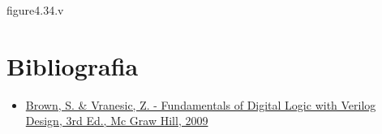 \begin{frame}[fragile]{figure4.34.v}
\end{frame} 


\section{Bibliografia} %

\begin{frame}{\insertsection} 
	\begin{itemize}
		\item \href{https://www.google.com.br/search?q=filetype\%3Apdf+Fundamentals+of+Digital+Logic+with+Verilog+Design+&oq=filetype\%3Apdf}{Brown, S. \& Vranesic, Z. - Fundamentals of Digital Logic with Verilog Design, 3rd Ed., Mc Graw Hill, 2009}
	\end{itemize}
\end{frame}

\begin{frame}
	\titlepage
\end{frame} 

